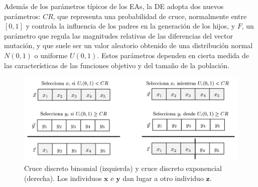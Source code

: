 Además de los parámetros típicos de los EAs, la DE adopta dos nuevos parámetros: $CR$,
que representa una probabilidad de cruce, normalmente entre $\left[ 0,1\right] $ y
controla la influencia de los padres en la generación de los hijos, y $F$, un parámetro
que regula las magnitudes relativas de las diferencias del vector mutación, y que suele ser
un valor aleatorio obtenido de una distribución normal $N(0,1)$ o uniforme $U(0,1)$. Estos
parámetros
dependen en cierta medida de las características de las funciones objetivo y del tamaño
de la población.

\begin{figure}[!htp]
\centering
\includegraphics[keepaspectratio,width=11.5cm]{figuras/crucesBinonialExponencial.jpg}
\caption{Cruce discreto binomial (izquierda) y cruce discreto exponencial (derecha). Los
individuos $\mathbf{x}$ e $\mathbf{y}$ dan lugar a otro individuo $\mathbf{z}$.}
\label{diferencial1}
\end{figure}

